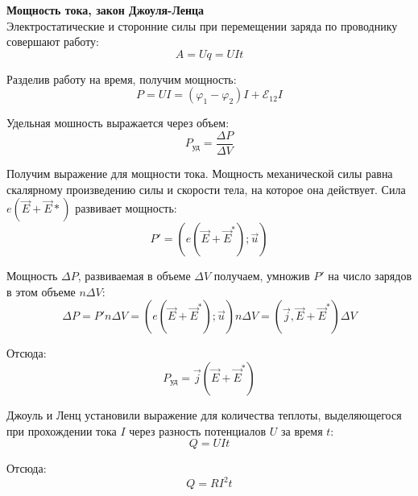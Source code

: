 \documentclass{article}
\begin{document}
	
	\textbf{Мощность тока, закон Джоуля-Ленца}\\

	Электростатические и сторонние силы при перемещении заряда по проводнику совершают работу:
	\begin{equation}
		A = Uq = UIt
	\end{equation}

	Разделив работу на время, получим мощность:
	\begin{equation}
		P = UI = (\varphi_1-\varphi_2)I + \mathcal{E}_{12}I
	\end{equation}

	Удельная мошность выражается через объем:
	\begin{equation}
		P_{\text{уд}} = \frac{\Delta P}{\Delta V}
	\end{equation}

	Получим выражение для мощности тока. Мощность механической силы равна скалярному произведению силы и скорости тела, на которое она действует. Сила $e(\vec E + \vec E*)$ развивает мощность:
	\begin{equation}
		P' = (e(\vec E + \vec E^*);\vec u)
	\end{equation}

	Мощность $\Delta P$, развиваемая в объеме $\Delta V$ получаем, умножив $P'$ на число зарядов в этом объеме $n\Delta V$:
	\begin{equation}
		\Delta P = P'n\Delta V = (e(\vec E + \vec E^*);\vec u) n\Delta V = (\vec j,\vec E + \vec E^*)\Delta V
	\end{equation}

	Отсюда:
	\begin{equation}
		P_{\text{уд}} = \vec j(\vec E + \vec E^*)
	\end{equation}

	Джоуль и Ленц установили выражение для количества теплоты, выделяющегося при прохождении тока $I$ через разность потенциалов $U$ за время $t$:
	\begin{equation}
		Q = UIt
	\end{equation}

	Отсюда:
	\begin{equation}
		Q = RI^2 t
	\end{equation}
\end{document}
